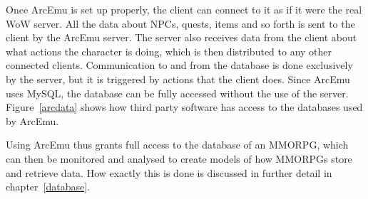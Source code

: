 Once ArcEmu is set up properly, the client can connect to it as if it were the real WoW server. All the data about NPCs, quests, items and so forth is sent to the client by the ArcEmu server. The server also receives data from the client about what actions the character is doing, which is then distributed to any other connected clients. Communication to and from the database is done exclusively by the server, but it is triggered by actions that the client does. Since ArcEmu uses MySQL, the database can be fully accessed without the use of the server. Figure~\ref{arcdata} shows how third party software has access to the databases used by ArcEmu.

Using ArcEmu thus grants full access to the database of an MMORPG, which can then be monitored and analysed to create models of how MMORPGs store and retrieve data. How exactly this is done is discussed in further detail in chapter~\ref{database}.